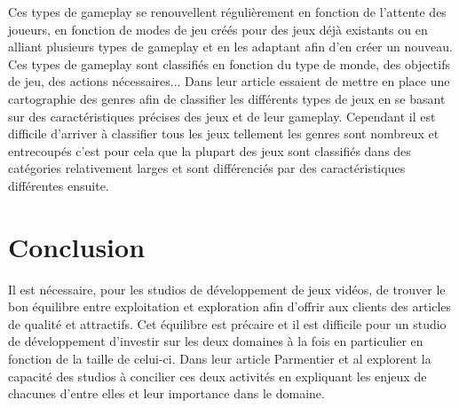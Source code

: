 Ces types de gameplay se renouvellent régulièrement en fonction de l'attente des joueurs, en fonction de modes de jeu créés pour des jeux déjà existants ou en alliant plusieurs types de gameplay et en les adaptant afin d'en créer un nouveau. Ces types de gameplay sont classifiés en fonction du type de monde, des objectifs de jeu, des actions nécessaires... Dans leur article \cite{HeintzStephanie2015TGGM} essaient de mettre en place une cartographie des genres afin de classifier les différents types de jeux en se basant sur des caractéristiques précises des jeux et de leur gameplay. Cependant il est difficile d'arriver à classifier tous les jeux tellement les genres sont nombreux et entrecoupés c'est pour cela que la plupart des jeux sont classifiés dans des catégories relativement larges et sont différenciés par des caractéristiques différentes ensuite.
 
\section{Conclusion}
Il est nécessaire, pour les studios de développement de jeux vidéos, de trouver le bon équilibre entre exploitation et exploration afin d'offrir aux clients des articles de qualité et attractifs. Cet équilibre est précaire et il est difficile pour un studio de développement d'investir sur les deux domaines à la fois en particulier en fonction de la taille de celui-ci. Dans leur article Parmentier et al \cite{ParmentierGuy2009Iecd} explorent la capacité des studios à concilier ces deux activités en expliquant les enjeux de chacunes d'entre elles et leur importance dans le domaine.

